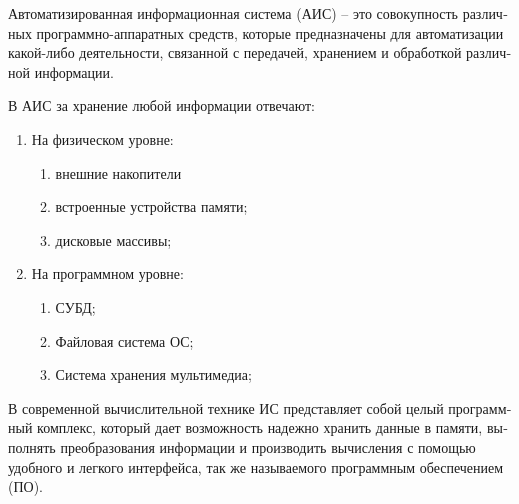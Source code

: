 \documentclass[a4paper, 12pt, titlepage]{article}
\begin{document}
\begin{otherlanguage}{russian}
\par Автоматизированная информационная система (АИС) – это совокупность различных программно-аппаратных средств, которые предназначены для автоматизации какой-либо деятельности, связанной с передачей, хранением и обработкой различной информации.\\

\par В АИС за хранение любой информации отвечают:

\begin{center}
  \begin{enumerate}
  \item На физическом уровне:
    \begin{enumerate}[label*=\arabic*.]
    \item внешние накопители
    \item встроенные устройства памяти;
    \item дисковые массивы;
    \end{enumerate}
  \item На программном уровне:
    \begin{enumerate}[label*=\arabic*.]
    \item СУБД;
    \item Файловая система ОС;
    \item Система хранения мультимедиа;
    \end{enumerate}
  \end{enumerate}
\end{center}

\par В современной вычислительной технике ИС представляет собой целый программный комплекс, который дает возможность надежно хранить данные в памяти, выполнять преобразования информации и производить вычисления с помощью удобного и легкого интерфейса, так же называемого программным обеспечением (ПО).\\


\end{otherlanguage}
\end{document}
